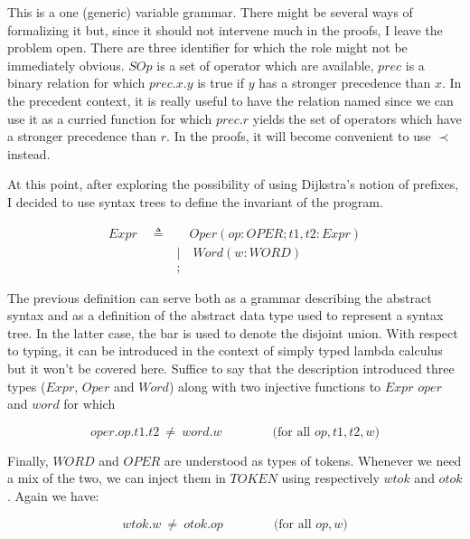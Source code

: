 \documentclass[10pt]{report}
\begin{document}
This is a one (generic) variable grammar.  There might be several ways of formalizing it but, since it should not intervene much in the proofs, I leave the problem open.  There are three identifier for which the role might not be immediately obvious.  $SOp$ is a set of operator which are available, $prec$ is a binary relation for which $prec.x.y$ is true if $y$ has a stronger precedence than $x$.  In the precedent context, it is really useful to have the relation named since we can use it as a curried function for which $prec.r$ yields the set of operators which have a stronger precedence than $r$.  In the proofs, it will become convenient to use $\prec$ instead.

At this point, after exploring the possibility of using Dijkstra's notion of prefixes, I decided to use syntax trees to define the invariant of the program.

\begin{align}
	Expr \quad \triangleq & \quad Oper (op: OPER; t1, t2: Expr) \label{asyntax} \\
		& | \quad Word (w: WORD) \nonumber \\
		& ; \nonumber
\end{align}

The previous definition can serve both as a grammar describing the abstract syntax and as a definition of the abstract data type used to represent a syntax tree.  In the latter case, the bar is used to denote the disjoint union.  With respect to typing, it can be introduced in the context of simply typed lambda calculus but it won't be covered here.  Suffice to say that the description introduced three types ($Expr$, $Oper$ and $Word$) along with two injective functions to $Expr$ $oper$ and $word$ for which

\begin{equation}
	oper.op.t1.t2 \ \neq \ word.w \qquad \qquad \text{(for all $op, t1, t2, w$)}
\end{equation} 

Finally, $WORD$ and $OPER$ are understood as types of tokens.  Whenever we need a mix of the two, we can inject them in $TOKEN$ using respectively $wtok$ and $otok$.  Again we have:

\begin{equation}
	wtok.w \ \neq \ otok.op \qquad \qquad \text{(for all $op, w$)}
\end{equation}
\end{document}
